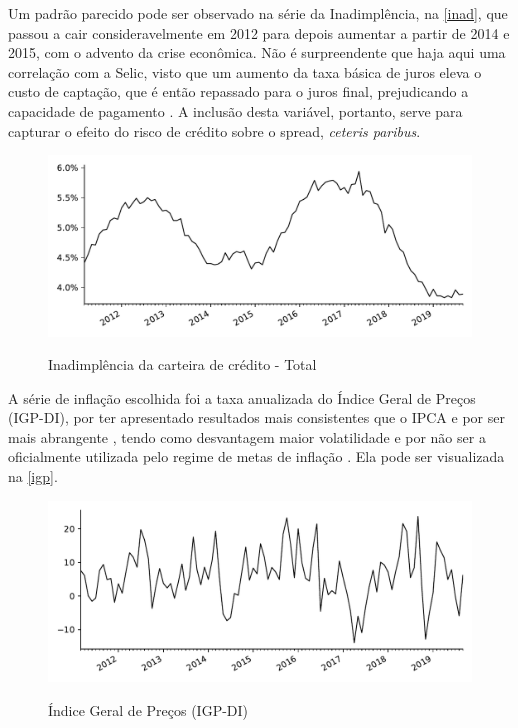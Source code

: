 \documentclass[a4paper,
               article,
               12pt,
               openany,
               oneside,
               english,
               brazil]{abntex2}
\numberwithin{equation}{section}
\begin{document}
    Um padrão parecido pode ser observado na série da Inadimplência, na \autoref{inad}, que passou a cair consideravelmente em 2012 para depois aumentar a partir de 2014 e 2015, com o advento da crise econômica. Não é surpreendente que haja aqui uma correlação com a Selic, visto que um aumento da taxa básica de juros eleva o custo de captação, que é então repassado para o juros final, prejudicando a capacidade de pagamento \cite[p.~390]{oliveira2007}. A inclusão desta variável, portanto, serve para capturar o efeito do risco de crédito sobre o spread, \textit{ceteris paribus}.

    \begin{figure}[t]
        \centering
        \caption{Inadimplência da carteira de crédito - Total}
        \includegraphics[width = \textwidth, scale=0.75]{inad.pdf}
        \label{inad}
    \end{figure}

    A série de inflação escolhida foi a taxa anualizada do Índice Geral de Preços (IGP-DI), por ter apresentado resultados mais consistentes que o IPCA \cite[p.~66]{rocha09} e por ser mais abrangente \cite[p.~21]{afanasieff02}, tendo como desvantagem maior volatilidade e por não ser a oficialmente utilizada pelo regime de metas de inflação \cite[23]{chaim}. Ela pode ser visualizada na \autoref{igp}.
    
\begin{figure}[h]
  \centering
    \caption{Índice Geral de Preços (IGP-DI)}
      \includegraphics[width = \textwidth, scale=0.75]{igp.pdf}
      \label{igp}
\end{figure}
    
\end{document}

